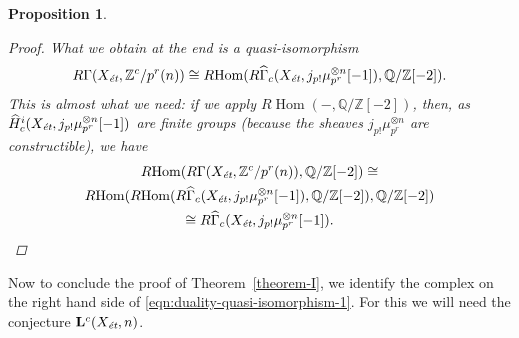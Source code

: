 \documentclass[leqno,12pt]{article}
\theoremstyle{plain}
\newtheorem{proposition}[theorem]{\indent\sc Proposition}
\theoremstyle{definition}
\DeclareMathOperator{\Hom}{Hom}
\newcommand{\QQ}{\mathbb{Q}}
\newcommand{\ZZ}{\mathbb{Z}}
\newcommand{\et}{\text{\it \'{e}t}}
\newcommand{\RHom}{R\!\Hom}
\begin{document}
\begin{proposition}
\begin{proof}
    What we obtain at the end is a quasi-isomorphism
    \[ R\Gamma (X_\et, \ZZ^c/p^r (n)) \cong
    \RHom (R\widehat{\Gamma}_c (X_\et, j_{p !} \mu_{p^r}^{\otimes n} [-1]), \QQ/\ZZ [-2]). \]
    This is almost what we need: if we apply $\RHom (-,\QQ/\ZZ [-2])$, then, as
    $\widehat{H}^i_c (X_\et, j_{p!} \mu_{p^r}^{\otimes n} [-1])$ are
    finite groups (because the sheaves $j_{p!} \mu_{p^r}^{\otimes n}$ are
    constructible), we have
    \begin{multline*}
      \RHom (R\Gamma (X_\et, \ZZ^c/p^r (n)), \QQ/\ZZ[-2]) \cong\\
      \RHom (\RHom (R\widehat{\Gamma}_c (X_\et, j_{p !} \mu_{p^r}^{\otimes n} [-1]), \QQ/\ZZ[-2]), \QQ/\ZZ[-2]) \\
      \cong R\widehat{\Gamma}_c (X_\et, j_{p !} \mu_{p^r}^{\otimes n} [-1]). \qedhere
    \end{multline*}
  \end{proof}
\end{proposition}

Now to conclude the proof of Theorem~\ref{theorem-I}, we identify the complex on
the right hand side of \eqref{eqn:duality-quasi-isomorphism-1}. For this we will
need the conjecture $\mathbf{L}^c (X_\et, n)$.
\end{document}

